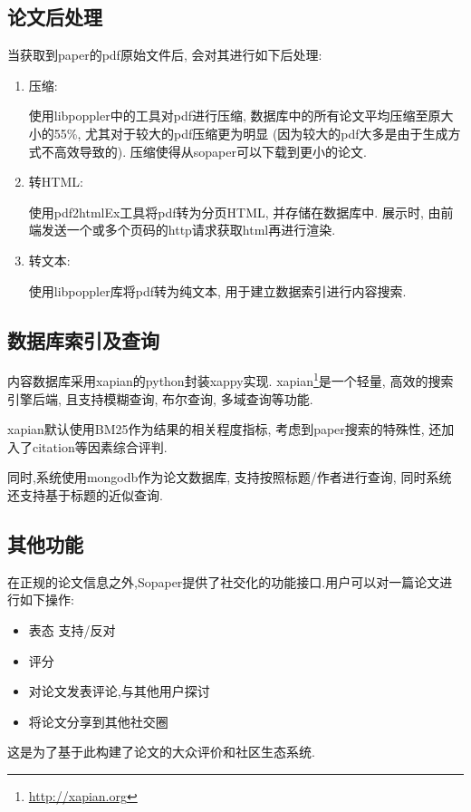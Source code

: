 \subsection{论文后处理}

当获取到paper的pdf原始文件后, 会对其进行如下后处理:
\begin{enumerate}
  \item 压缩:

    使用libpoppler中的工具对pdf进行压缩, 数据库中的所有论文平均压缩至原大小的55\%,
    尤其对于较大的pdf压缩更为明显 (因为较大的pdf大多是由于生成方式不高效导致的).
    压缩使得从sopaper可以下载到更小的论文.

  \item 转HTML:

    使用pdf2htmlEx工具将pdf转为分页HTML, 并存储在数据库中.
    展示时, 由前端发送一个或多个页码的http请求获取html再进行渲染.

  \item 转文本:

    使用libpoppler库将pdf转为纯文本, 用于建立数据索引进行内容搜索.

\end{enumerate}
\subsection{数据库索引及查询}

内容数据库采用xapian的python封装xappy实现.
xapian\footnote{\url{http://xapian.org}}是一个轻量, 高效的搜索引擎后端, 且支持模糊查询, 布尔查询, 多域查询等功能.

xapian默认使用BM25作为结果的相关程度指标, 考虑到paper搜索的特殊性, 还加入了citation等因素综合评判.

同时,系统使用mongodb作为论文数据库, 支持按照标题/作者进行查询, 同时系统还支持基于标题的近似查询.

\subsection{其他功能}

在正规的论文信息之外,Sopaper提供了社交化的功能接口.用户可以对一篇论文进行如下操作:
\begin{itemize}
  \item 表态 支持/反对
  \item 评分
  \item 对论文发表评论,与其他用户探讨
  \item 将论文分享到其他社交圈
\end{itemize}
这是为了基于此构建了论文的大众评价和社区生态系统.

